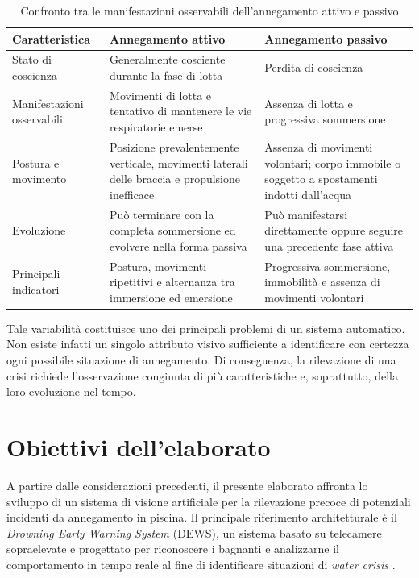 \begin{table}[htbp]
    \centering
    \caption[Confronto tra annegamento attivo e passivo]{Confronto tra le manifestazioni osservabili dell'annegamento attivo e passivo}
    \label{tab:confronto-annegamento-attivo-passivo}
    \small
    \renewcommand{\arraystretch}{1.15}
    \begin{tabularx}{\textwidth}{|>{\raggedright\arraybackslash}m{2.8cm}||>{\raggedright\arraybackslash}X|>{\raggedright\arraybackslash}X|}
        \hline
        Caratteristica & Annegamento attivo & Annegamento passivo \\
        \hline\hline
        Stato di coscienza & Generalmente cosciente durante la fase di lotta & Perdita di coscienza \\
        \hline
        Manifestazioni osservabili & Movimenti di lotta e tentativo di mantenere le vie respiratorie emerse & Assenza di lotta e progressiva sommersione \\
        \hline
        Postura e movimento & Posizione prevalentemente verticale, movimenti laterali delle braccia e propulsione inefficace & Assenza di movimenti volontari; corpo immobile o soggetto a spostamenti indotti dall'acqua \\
        \hline
        Evoluzione & Può terminare con la completa sommersione ed evolvere nella forma passiva & Può manifestarsi direttamente oppure seguire una precedente fase attiva \\
        \hline
        Principali indicatori & Postura, movimenti ripetitivi e alternanza tra immersione ed emersione & Progressiva sommersione, immobilità e assenza di movimenti volontari \\
        \hline
    \end{tabularx}

\end{table}

Tale variabilità costituisce uno dei principali problemi di un sistema automatico. Non esiste infatti un singolo attributo visivo sufficiente a identificare con certezza ogni possibile situazione di annegamento. Di conseguenza, la rilevazione di una crisi richiede l'osservazione congiunta di più caratteristiche e, soprattutto, della loro evoluzione nel tempo.

\section{Obiettivi dell'elaborato}

A partire dalle considerazioni precedenti, il presente elaborato affronta lo sviluppo di un sistema di visione artificiale per la rilevazione precoce di potenziali incidenti da annegamento in piscina. Il principale riferimento architetturale è il \textit{Drowning Early Warning System} (DEWS), un sistema basato su telecamere sopraelevate e progettato per riconoscere i bagnanti e analizzarne il comportamento in tempo reale al fine di identificare situazioni di \emph{water crisis} \cite{Eng2008DEWS}.

